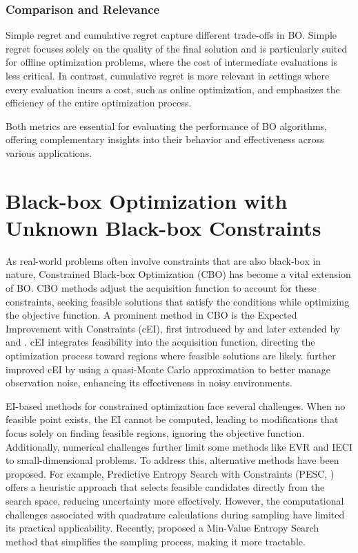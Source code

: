\subsubsection{Comparison and Relevance}

Simple regret and cumulative regret capture different trade-offs in BO. Simple regret focuses solely on the quality of the final solution and is particularly suited for offline optimization problems, where the cost of intermediate evaluations is less critical. In contrast, cumulative regret is more relevant in settings where every evaluation incurs a cost, such as online optimization, and emphasizes the efficiency of the entire optimization process.

Both metrics are essential for evaluating the performance of BO algorithms, offering complementary insights into their behavior and effectiveness across various applications.

\section{Black-box Optimization with Unknown Black-box Constraints}
\label{section:bo_unknown_constraints}
As real-world problems often involve constraints that are also black-box in nature, Constrained Black-box Optimization (CBO) has become a vital extension of BO. CBO methods adjust the acquisition function to account for these constraints, seeking feasible solutions that satisfy the conditions while optimizing the objective function. A prominent method in CBO is the Expected Improvement with Constraints (cEI), first introduced by \citep{schonlau1998global} and later extended by \citep{gardner2014bayesian} and \citep{gelbart2014bayesian}. cEI integrates feasibility into the acquisition function, directing the optimization process toward regions where feasible solutions are likely. \citet{letham2019constrained} further improved cEI by using a quasi-Monte Carlo approximation to better manage observation noise, enhancing its effectiveness in noisy environments.

EI-based methods for constrained optimization face several challenges. When no feasible point exists, the EI cannot be computed, leading to modifications that focus solely on finding feasible regions, ignoring the objective function. Additionally, numerical challenges further limit some methods like EVR and IECI to small-dimensional problems. To address this, alternative methods have been proposed. For example, Predictive Entropy Search with Constraints (PESC,  \citealp{hernandez2015predictive}) offers a heuristic approach that selects feasible candidates directly from the search space, reducing uncertainty more effectively. However, the computational challenges associated with quadrature calculations during sampling have limited its practical applicability. Recently, \citet{takeno2022sequential} proposed a Min-Value Entropy Search method that simplifies the sampling process, making it more tractable.

